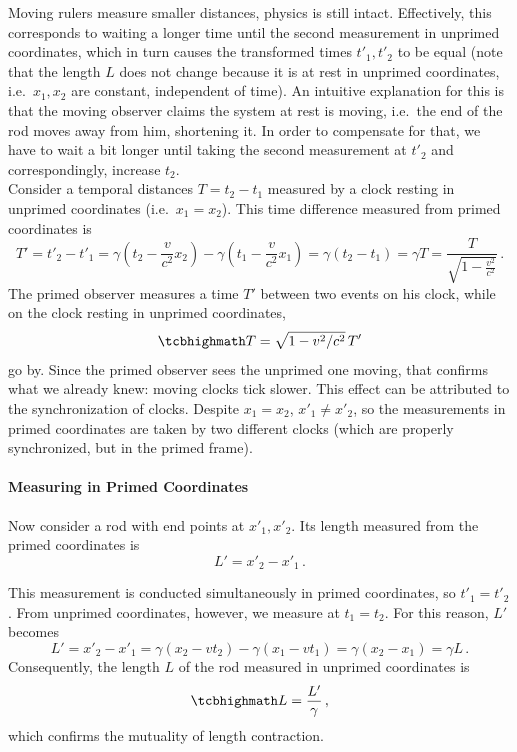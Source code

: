 \documentclass[../relativity_main.tex]{subfiles}
\begin{document}
Moving rulers measure smaller distances, physics is still intact.
Effectively, this corresponds to waiting a longer time until the second measurement in unprimed coordinates, which in turn causes the transformed times $t'_1, t'_2$ to be equal (note that the length $L$ does not change because it is at rest in unprimed coordinates, i.e.~$x_1, x_2$ are constant, independent of time). An intuitive explanation for this is that the moving observer claims the system at rest is moving, i.e.~the end of the rod moves away from him, shortening it. In order to compensate for that, we have to wait a bit longer until taking the second measurement at $t'_2$ and correspondingly, increase $t_2$.\\


Consider a temporal distances $T = t_2 - t_1$ measured by a clock resting in unprimed coordinates (i.e.~$x_1 = x_2$). This time difference measured from primed coordinates is
\begin{equation*}
	T' = t'_2 - t'_1 = \gamma (t_2 - \frac{v}{c^2} x_2) - \gamma (t_1 - \frac{v}{c^2} x_1) = \gamma (t_2 - t_1) = \gamma T = \frac{T}{\sqrt{1 - \frac{v^2}{c^2}}} \, .
\end{equation*}
The primed observer measures a time $T'$ between two events on his clock, while on the clock resting in unprimed coordinates,
\begin{equation}
	\eqbox{
	T = \sqrt{1 - v^2 / c^2} \, T'
	}
\end{equation}
go by. Since the primed observer sees the unprimed one moving, that confirms what we already knew: moving clocks tick slower. This effect can be attributed to the synchronization of clocks. Despite $x_1 = x_2$, $x'_1 \neq x'_2$, so the measurements in primed coordinates are taken by two different clocks (which are properly synchronized, but in the primed frame).



			\paragraph{Measuring in Primed Coordinates}
Now consider a rod with end points at $x'_1, x'_2$. Its length measured from the primed coordinates is
\begin{equation*}\label{eq:rod_primed_coords_from_primed}
	L' = x'_2 - x'_1 \, .
\end{equation*}

This measurement is conducted simultaneously in primed coordinates, so $t'_1 = t'_2$. From unprimed coordinates, however, we measure at $t_1 = t_2$. For this reason, $L'$ becomes
\begin{equation*}
	L' = x'_2 - x'_1 = \gamma (x_2 - v t_2) - \gamma (x_1 - v t_1) = \gamma (x_2 - x_1) = \gamma L \, .
\end{equation*}
Consequently, the length $L$ of the rod measured in unprimed coordinates is
\begin{equation}
	\eqbox{
	L = \frac{L'}{\gamma}
	} \, ,
\end{equation}
which confirms the mutuality of length contraction.
\end{document}
